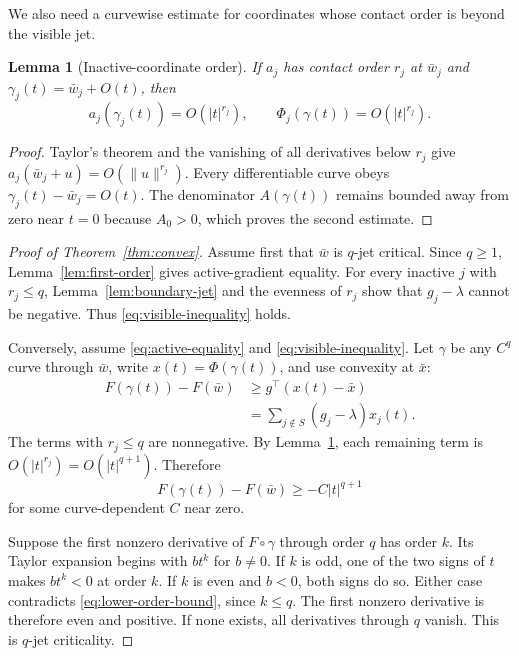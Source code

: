 \documentclass[11pt]{article}
\newtheorem{lemma}[theorem]{Lemma}
\theoremstyle{definition}
\theoremstyle{remark}
\begin{document}
We also need a curvewise estimate for coordinates whose contact order is
beyond the visible jet.

\begin{lemma}[Inactive-coordinate order]\label{lem:inactive-order}
If $a_j$ has contact order $r_j$ at $\bar w_j$ and
$\gamma_j(t)=\bar w_j+O(t)$, then
\[
  a_j(\gamma_j(t))=O(|t|^{r_j}),
  \qquad
  \Phi_j(\gamma(t))=O(|t|^{r_j}).
\]
\end{lemma}

\begin{proof}
Taylor's theorem and the vanishing of all derivatives below $r_j$ give
$a_j(\bar w_j+u)=O(\lVert u\rVert^{r_j})$. Every differentiable curve obeys
$\gamma_j(t)-\bar w_j=O(t)$. The denominator $A(\gamma(t))$ remains bounded
away from zero near $t=0$ because $A_0>0$, which proves the second estimate.
\end{proof}

\begin{proof}[Proof of Theorem~\ref{thm:convex}]
Assume first that $\bar w$ is $q$-jet critical. Since $q\ge1$,
Lemma~\ref{lem:first-order} gives active-gradient equality. For every inactive
$j$ with $r_j\le q$, Lemma~\ref{lem:boundary-jet} and the evenness of $r_j$
show that $g_j-\lambda$ cannot be negative. Thus
\eqref{eq:visible-inequality} holds.

Conversely, assume \eqref{eq:active-equality} and
\eqref{eq:visible-inequality}. Let $\gamma$ be any $C^q$ curve through
$\bar w$, write $x(t)=\Phi(\gamma(t))$, and use convexity at $\bar x$:
\begin{align}
  F(\gamma(t))-F(\bar w)
  &\ge g^\top(x(t)-\bar x)\\
  &=\sum_{j\notin S}(g_j-\lambda)x_j(t).
  \label{eq:convex-bound}
\end{align}
The terms with $r_j\le q$ are nonnegative. By
Lemma~\ref{lem:inactive-order}, each remaining term is
$O(|t|^{r_j})=O(|t|^{q+1})$. Therefore
\begin{equation}\label{eq:lower-order-bound}
  F(\gamma(t))-F(\bar w)\ge -C|t|^{q+1}
\end{equation}
for some curve-dependent $C$ near zero.

Suppose the first nonzero derivative of $F\circ\gamma$ through order $q$ has
order $k$. Its Taylor expansion begins with $bt^k$ for $b\ne0$. If $k$ is
odd, one of the two signs of $t$ makes $bt^k<0$ at order $k$. If $k$ is even
and $b<0$, both signs do so. Either case contradicts
\eqref{eq:lower-order-bound}, since $k\le q$. The first nonzero derivative is
therefore even and positive. If none exists, all derivatives through $q$
vanish. This is $q$-jet criticality.
\end{proof}
\end{document}
